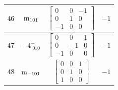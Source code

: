\documentclass[fleqn,8pt]{jsarticle}
\begin{document}
\begin{longtable}{cccc}
$ 46 $ & $ {\rm m}_{101} $ & $ \begin{bmatrix} 0 & 0 & -1 \\ 0 & 1 & 0 \\ -1 & 0 & 0 \end{bmatrix} $ & $ -1 $ \\ \hline
$ 47 $ & $ -4^{-}_{\,\,010} $ & $ \begin{bmatrix} 0 & 0 & 1 \\ 0 & -1 & 0 \\ -1 & 0 & 0 \end{bmatrix} $ & $ -1 $ \\ \hline
$ 48 $ & $ {\rm m}_{-101} $ & $ \begin{bmatrix} 0 & 0 & 1 \\ 0 & 1 & 0 \\ 1 & 0 & 0 \end{bmatrix} $ & $ -1 $ \\
\end{longtable}
\end{document}
